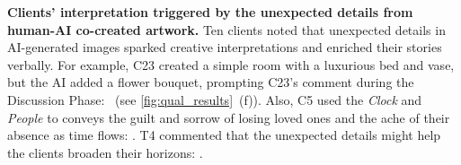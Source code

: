 \textbf{Clients' interpretation triggered by the unexpected details from human-AI co-created artwork.} 
Ten clients noted that unexpected details in AI-generated images sparked creative interpretations and enriched their stories verbally. 
For example, C23 created a simple room with a luxurious bed and vase, but the AI added a flower bouquet, prompting C23's comment during the Discussion Phase: ~(see \autoref{fig:qual_results}~(f)).
Also, C5 used the \textit{Clock} and \textit{People} to conveys the guilt and sorrow of losing loved ones and the ache of their absence as time flows: .
T4 commented that the unexpected details might help the clients broaden their horizons: .







